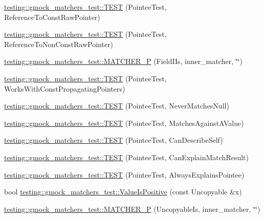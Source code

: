 \begin{DoxyCompactItemize}
\item 
\hyperlink{namespacetesting_1_1gmock__matchers__test_aebba40e49fe790490ba88984fdc7c7a6}{testing\+::gmock\+\_\+matchers\+\_\+test\+::\+T\+E\+ST} (Pointee\+Test, Reference\+To\+Const\+Raw\+Pointer)
\item 
\hyperlink{namespacetesting_1_1gmock__matchers__test_a2d2296f6b23130be225b8df48746dfd5}{testing\+::gmock\+\_\+matchers\+\_\+test\+::\+T\+E\+ST} (Pointee\+Test, Reference\+To\+Non\+Const\+Raw\+Pointer)
\item 
\hyperlink{namespacetesting_1_1gmock__matchers__test_a3d3f285bba1766bf9daf840a16e79924}{testing\+::gmock\+\_\+matchers\+\_\+test\+::\+M\+A\+T\+C\+H\+E\+R\+\_\+P} (Field\+I\+Is, inner\+\_\+matcher, \char`\"{}\char`\"{})
\item 
\hyperlink{namespacetesting_1_1gmock__matchers__test_a9d851a5bb597fa45b5d1cf3f295398e8}{testing\+::gmock\+\_\+matchers\+\_\+test\+::\+T\+E\+ST} (Pointee\+Test, Works\+With\+Const\+Propagating\+Pointers)
\item 
\hyperlink{namespacetesting_1_1gmock__matchers__test_ac778a9cebf9306a5efd27cc1186d8269}{testing\+::gmock\+\_\+matchers\+\_\+test\+::\+T\+E\+ST} (Pointee\+Test, Never\+Matches\+Null)
\item 
\hyperlink{namespacetesting_1_1gmock__matchers__test_afe22e8230dc7a34498e4b2f91dcdd7cd}{testing\+::gmock\+\_\+matchers\+\_\+test\+::\+T\+E\+ST} (Pointee\+Test, Matches\+Against\+A\+Value)
\item 
\hyperlink{namespacetesting_1_1gmock__matchers__test_ac8b9baa938635d587f0b0df1073208e2}{testing\+::gmock\+\_\+matchers\+\_\+test\+::\+T\+E\+ST} (Pointee\+Test, Can\+Describe\+Self)
\item 
\hyperlink{namespacetesting_1_1gmock__matchers__test_a263ede06f6b32a625bb40e4f4c58c8dc}{testing\+::gmock\+\_\+matchers\+\_\+test\+::\+T\+E\+ST} (Pointee\+Test, Can\+Explain\+Match\+Result)
\item 
\hyperlink{namespacetesting_1_1gmock__matchers__test_a00128de027ff6f49f82a7011dd346d43}{testing\+::gmock\+\_\+matchers\+\_\+test\+::\+T\+E\+ST} (Pointee\+Test, Always\+Explains\+Pointee)
\item 
bool \hyperlink{namespacetesting_1_1gmock__matchers__test_a7c429b4fa8a7835724d9e28033e908b2}{testing\+::gmock\+\_\+matchers\+\_\+test\+::\+Value\+Is\+Positive} (const Uncopyable \&x)
\item 
\hyperlink{namespacetesting_1_1gmock__matchers__test_a55a8eba9beb33753baf7690d4cb9cd7e}{testing\+::gmock\+\_\+matchers\+\_\+test\+::\+M\+A\+T\+C\+H\+E\+R\+\_\+P} (Uncopyable\+Is, inner\+\_\+matcher, \char`\"{}\char`\"{})

\end{DoxyCompactItemize}
